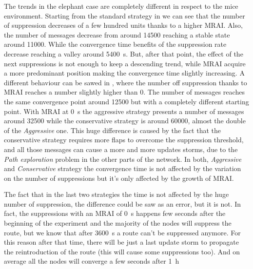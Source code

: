 The trends in the elephant case are completely different in respect to the
mice environment.
Starting from the standard strategy in 
we can see that the number of suppression decreases of a few hundred units
thanks to a higher \ac{MRAI}.
Also, the number of messages decrease from around \num{14500} reaching a stable
state around \num{11000}.
While the convergence time benefits of the suppression rate decrease reaching
a valley around \SI{5400}{\second}.
But, after that point, the effect of the next suppressions is not enough to keep
a descending trend, while \ac{MRAI} acquire a more predominant position making
the convergence time slightly increasing.
A different behaviour can be sawed in
,
where the number off suppression thanks to \ac{MRAI} reaches a number slightly
higher than \num{0}.
The number of messages reaches the same convergence point around \num{12500} but
with a completely different starting point.
With \ac{MRAI} at \SI{0}{\second} the aggressive strategy presents a number of
messages around \num{32500} while the conservative strategy is around \num{60000},
almost the double of the \textit{Aggressive} one.
This huge difference is caused by the fact that the conservative strategy requires
more flaps to overcome the suppression threshold, and all those messages can
cause a more and more updates storms, due to the \textit{Path exploration} problem
in the other parts of the network.
In both, \textit{Aggressive} and \textit{Conservative} strategy the convergence
time is not affected by the variation on the number of suppressions but it's only
affected by the growth of \ac{MRAI}.

The fact that in the last two strategies the time is not affected by the huge number
of suppression, the difference could be saw as an error, but it is not.
In fact, the suppressions with an \ac{MRAI} of \SI{0}{\second} happens
few seconds after the beginning of the experiment and the majority of the nodes
will suppress the route, but we know that after \SI{3600}{\second} a route
can't be suppressed anymore.
For this reason after that time, there will be just a last update storm to propagate
the reintroduction of the route (this will cause some suppressions too).
And on average all the nodes will converge a few seconds after \SI{1}{\hour}


